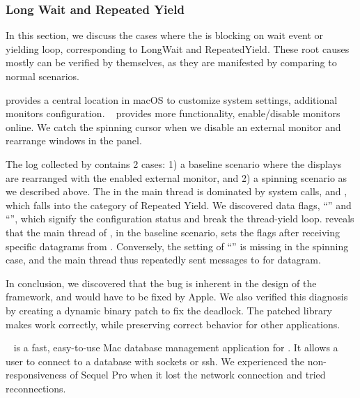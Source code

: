 \subsubsection{Long Wait and Repeated Yield}

In this section, we discuss the cases where the \spinningnode is blocking on
wait event or yielding loop, corresponding to LongWait and RepeatedYield.
These root causes mostly can be verified by themselves, as they are
manifested by comparing to normal scenarios.


 provides a central location in macOS to
customize system settings, \eg additional monitors configuration.
~\cite{disablemonitor} provides more functionality,
enable/disable monitors online. We catch the spinning cursor when we disable
an external monitor and rearrange windows in the  panel.

The log collected by \xxx contains 2 cases: 1) a baseline scenario where
the displays are rearranged with the enabled external monitor, and 2) a
spinning scenario as we described above. The \spinningnode in the main
thread is dominated by system calls,  and ,
which falls into the category of Repeated Yield. We discovered data flags,
``'' and ``'', which
signify the configuration status and break the thread-yield loop. \xxx reveals
that the main thread of , in the baseline scenario, sets
the flags after receiving specific datagrams from . Conversely,
the setting of ``'' is missing in the spinning case,
and the main thread thus repeatedly sent messages to  for
datagram.

In conclusion, we discovered that the bug is inherent in the design of the
 framework, and would have to be fixed by Apple. We also
verified this diagnosis by creating a dynamic binary patch to fix the deadlock.
The patched library makes  work correctly, while preserving
correct behavior for other applications.


~\cite{SequelPro} is a fast, easy-to-use Mac database management
application for . It allows a user to connect to a database with sockets or ssh.
We experienced the non-responsiveness of Sequel Pro when it lost the network
connection and tried reconnections.


